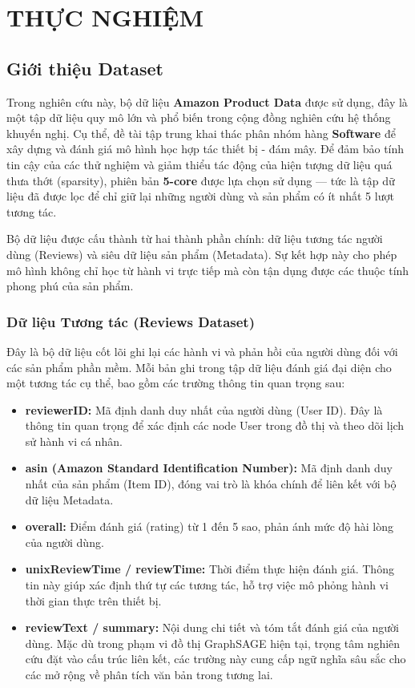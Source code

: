 \chapter{THỰC NGHIỆM}

\section{Giới thiệu Dataset}

Trong nghiên cứu này, bộ dữ liệu \textbf{Amazon Product Data} được sử dụng, đây là một tập dữ liệu quy mô lớn và phổ biến trong cộng đồng nghiên cứu hệ thống khuyến nghị. Cụ thể, đề tài tập trung khai thác phân nhóm hàng \textbf{Software} để xây dựng và đánh giá mô hình học hợp tác thiết bị - đám mây. Để đảm bảo tính tin cậy của các thử nghiệm và giảm thiểu tác động của hiện tượng dữ liệu quá thưa thớt (sparsity), phiên bản \textbf{5-core} được lựa chọn sử dụng — tức là tập dữ liệu đã được lọc để chỉ giữ lại những người dùng và sản phẩm có ít nhất 5 lượt tương tác.

Bộ dữ liệu được cấu thành từ hai thành phần chính: dữ liệu tương tác người dùng (Reviews) và siêu dữ liệu sản phẩm (Metadata). Sự kết hợp này cho phép mô hình không chỉ học từ hành vi trực tiếp mà còn tận dụng được các thuộc tính phong phú của sản phẩm.

\subsection{Dữ liệu Tương tác (Reviews Dataset)}

Đây là bộ dữ liệu cốt lõi ghi lại các hành vi và phản hồi của người dùng đối với các sản phẩm phần mềm. Mỗi bản ghi trong tập dữ liệu đánh giá đại diện cho một tương tác cụ thể, bao gồm các trường thông tin quan trọng sau:

\begin{itemize}
    \item \textbf{reviewerID:} Mã định danh duy nhất của người dùng (User ID). Đây là thông tin quan trọng để xác định các node User trong đồ thị và theo dõi lịch sử hành vi cá nhân.
    \item \textbf{asin (Amazon Standard Identification Number):} Mã định danh duy nhất của sản phẩm (Item ID), đóng vai trò là khóa chính để liên kết với bộ dữ liệu Metadata.
    \item \textbf{overall:} Điểm đánh giá (rating) từ 1 đến 5 sao, phản ánh mức độ hài lòng của người dùng.
    \item \textbf{unixReviewTime / reviewTime:} Thời điểm thực hiện đánh giá. Thông tin này giúp xác định thứ tự các tương tác, hỗ trợ việc mô phỏng hành vi thời gian thực trên thiết bị.
    \item \textbf{reviewText / summary:} Nội dung chi tiết và tóm tắt đánh giá của người dùng. Mặc dù trong phạm vi đồ thị GraphSAGE hiện tại, trọng tâm nghiên cứu đặt vào cấu trúc liên kết, các trường này cung cấp ngữ nghĩa sâu sắc cho các mở rộng về phân tích văn bản trong tương lai.
\end{itemize}

